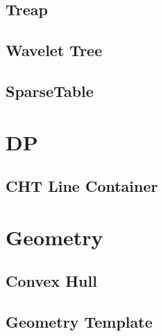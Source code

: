 \subsection{Treap}
\vspace{-2.2ex}
\raggedbottom
\vspace{-3.2ex}
\hrulefill
\subsection{Wavelet Tree}
\vspace{-2.2ex}
\raggedbottom
\vspace{-3.2ex}
\hrulefill
\subsection{SparseTable}
\vspace{-2.2ex}
\raggedbottom
\vspace{-3.2ex}
\hrulefill

\section{DP}
\subsection{CHT Line Container}
\vspace{-2.2ex}
\raggedbottom
\vspace{-3.2ex}
\hrulefill

\section{Geometry}
\subsection{Convex Hull}
\vspace{-2.2ex}
\raggedbottom
\vspace{-3.2ex}
\hrulefill
\subsection{Geometry Template}
\vspace{-2.2ex}
\raggedbottom
\vspace{-3.2ex}
\hrulefill
